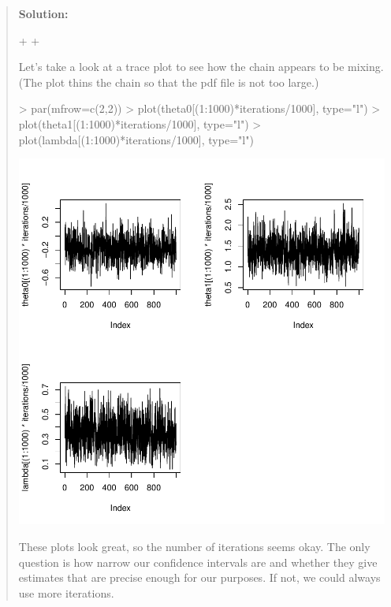 \documentclass{article}
\begin{document}
\begin{enumerate}[(i)]
\begin{quotation}{\bf Solution:}
\begin{Schunk}
\begin{Sinput}
{{+   }
+ }
\end{Sinput}
\end{Schunk}
Let's take a look at a trace plot to see how the chain appears to be mixing.
(The plot thins the chain so that the pdf file is not too large.)
\begin{Schunk}
\begin{Sinput}
> par(mfrow=c(2,2))
> plot(theta0[(1:1000)*iterations/1000], type="l")
> plot(theta1[(1:1000)*iterations/1000], type="l")
> plot(lambda[(1:1000)*iterations/1000], type="l")
\end{Sinput}
\end{Schunk}
\includegraphics{takehomeSolutions2012-005}

These plots look great, so the number of iterations seems okay.  The only
question is how narrow our confidence intervals are and whether they 
give estimates that are precise enough for our purposes.  If not, we could
always use more iterations.
\end{quotation}


\end{enumerate}
\end{document}
